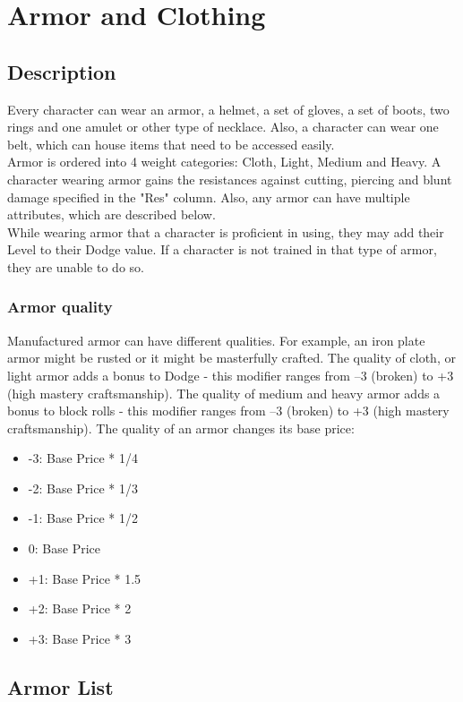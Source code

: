 \chapter{Armor and Clothing}\label{ch:armor}
\section{Description}\label{armorDescription}
Every character can wear an armor, a helmet, a set of gloves, a set of boots, two rings and one amulet or other type of necklace.
Also, a character can wear one belt, which can house items that need to be accessed easily.\\
Armor is ordered into 4 weight categories: Cloth, Light, Medium and Heavy.
A character wearing armor gains the resistances against cutting, piercing and blunt damage specified in the "Res" column.
Also, any armor can have multiple attributes, which are described below.\\
While wearing armor that a character is proficient in using, they may add their Level to their Dodge value.
If a character is not trained in that type of armor, they are unable to do so.
\subsection{Armor quality}\label{subsec:armorQuality}
Manufactured armor can have different qualities.
For example, an iron plate armor might be rusted or it might be masterfully crafted.
The quality of cloth, or light armor adds a bonus to Dodge - this modifier ranges from --3 (broken) to +3 (high mastery craftsmanship).
The quality of medium and heavy armor adds a bonus to block rolls - this modifier ranges from --3 (broken) to +3 (high mastery craftsmanship).
The quality of an armor changes its base price:\\

\begin{itemize}
    \item -3: Base Price * 1/4
    \item -2: Base Price * 1/3
    \item -1: Base Price * 1/2
    \item 0: Base Price
    \item +1: Base Price * 1.5
    \item +2: Base Price * 2
    \item +3: Base Price * 3
\end{itemize}

\section{Armor List}\label{armorList}


